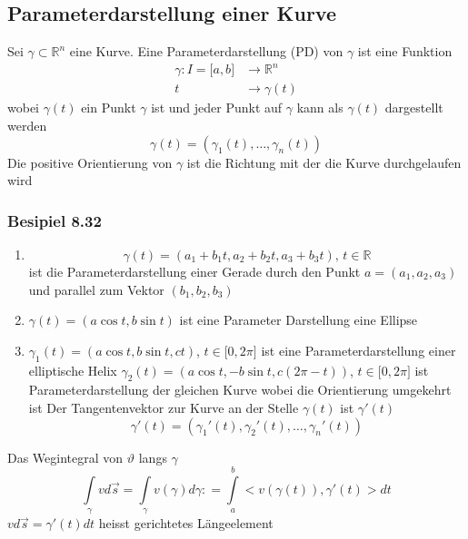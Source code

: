 \subsection*{Parameterdarstellung einer Kurve}
Sei $\gamma\subset\mathbb{R}^n$ eine Kurve. Eine Parameterdarstellung (PD) von $\gamma$ ist eine Funktion 
\begin{align*}
\gamma : I=\lbrack a,b\rbrack &\rightarrow\mathbb{R}^n\\
t &\rightarrow \gamma (t)
\end{align*}
wobei $\gamma\left( t\right)$ ein Punkt $\gamma$ ist und jeder Punkt auf $\gamma$ kann als $\gamma\left( t\right)$ dargestellt werden
$$\gamma\left( t\right) = \left( \gamma_1 (t),\dots,\gamma_n (t)\right)$$
Die positive Orientierung von $\gamma$ ist die Richtung mit der die Kurve durchgelaufen wird
\subsubsection*{Besipiel 8.32}
\begin{enumerate}
\item $$\gamma (t)=\left( a_1 +b_1 t,a_2 +b_2 t,a_3 +b_3 t\right)\text{, }t\in\mathbb{R}$$
ist die Parameterdarstellung einer Gerade durch den Punkt $a=\left( a_1,a_2,a_3\right)$ und parallel zum Vektor $\left( b_1,b_2,b_3\right)$
\item $\gamma (t)=\left( a\cos t,b\sin t\right)$ ist eine Parameter Darstellung eine Ellipse
\item $\gamma_1 (t)=\left( a\cos t,b\sin t, ct\right)$, $t\in\lbrack 0,2\pi\rbrack$ ist eine Parameterdarstellung einer elliptische Helix 
$\gamma_2 (t)=\left( a\cos t,-b\sin t, c(2\pi -t)\right)$, $t\in\lbrack 0,2\pi\rbrack$ ist Parameterdarstellung der gleichen Kurve wobei die Orientierung umgekehrt ist 
Der Tangentenvektor zur Kurve an der Stelle $\gamma (t)$ ist $\gamma' (t)$ $$\gamma'(t)=\left( \gamma_1'(t),\gamma_2'(t),\dots, \gamma_n'(t)\right)$$
\end{enumerate}

\begin{definition}{8.33}
Das Wegintegral von $\vartheta$ langs $\gamma$ 
\[\int\limits_\gamma  {vd\vec s}  = \int\limits_\gamma  {v(\gamma )d\gamma : = \int\limits_a^b { < v\left( {\gamma \left( t \right)} \right),\gamma '(t) > dt} } \] ${vd\vec s}=\gamma'(t)dt$ heisst gerichtetes Längeelement
\end{definition}
